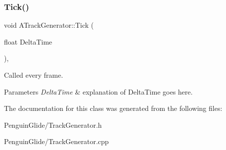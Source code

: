 \subsubsection{\texorpdfstring{Tick()}{Tick()}}
{\footnotesize\ttfamily void A\+Track\+Generator\+::\+Tick (\begin{DoxyParamCaption}\item[{float}]{Delta\+Time }\end{DoxyParamCaption})\hspace{0.3cm}{\ttfamily [override]}, {\ttfamily [virtual]}}



Called every frame. 


\begin{DoxyParams}{Parameters}
{\em Delta\+Time} & explanation of Delta\+Time goes here. \\
\hline
\end{DoxyParams}


The documentation for this class was generated from the following files\+:\begin{DoxyCompactItemize}
\item 
Penguin\+Glide/Track\+Generator.\+h\item 
Penguin\+Glide/Track\+Generator.\+cpp\end{DoxyCompactItemize}
